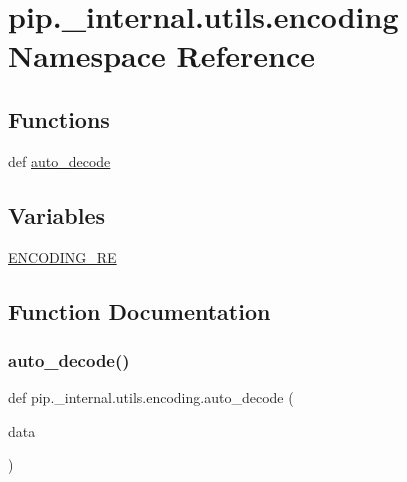 \hypertarget{namespacepip_1_1__internal_1_1utils_1_1encoding}{}\section{pip.\+\_\+internal.\+utils.\+encoding Namespace Reference}
\label{namespacepip_1_1__internal_1_1utils_1_1encoding}
\subsection*{Functions}
\begin{DoxyCompactItemize}
\item 
def \hyperlink{namespacepip_1_1__internal_1_1utils_1_1encoding_a24afc4099273436bf494fb9a742e7898}{auto\+\_\+decode}
\end{DoxyCompactItemize}
\subsection*{Variables}
\begin{DoxyCompactItemize}
\item 
\hyperlink{namespacepip_1_1__internal_1_1utils_1_1encoding_af27297a9b4c563a9e1f1f5791f6e5d4d}{E\+N\+C\+O\+D\+I\+N\+G\+\_\+\+RE}
\end{DoxyCompactItemize}


\subsection{Function Documentation}
\mbox{\label{namespacepip_1_1__internal_1_1utils_1_1encoding_a24afc4099273436bf494fb9a742e7898}} 
\subsubsection{\texorpdfstring{auto\+\_\+decode()}{auto\_decode()}}
{\footnotesize\ttfamily def pip.\+\_\+internal.\+utils.\+encoding.\+auto\+\_\+decode (\begin{DoxyParamCaption}\item[{}]{data }\end{DoxyParamCaption})}



